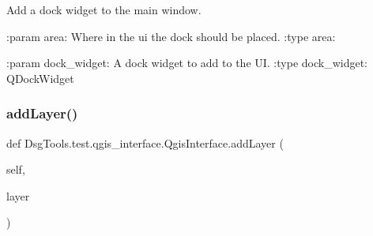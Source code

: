 \begin{DoxyVerb}Add a dock widget to the main window.

:param area: Where in the ui the dock should be placed.
:type area:

:param dock_widget: A dock widget to add to the UI.
:type dock_widget: QDockWidget
\end{DoxyVerb}
 \mbox{\label{class_dsg_tools_1_1test_1_1qgis__interface_1_1_qgis_interface_af2c8f477fd5f365124ed2008e7711aa2}} 
\subsubsection{\texorpdfstring{add\+Layer()}{addLayer()}}
{\footnotesize\ttfamily def Dsg\+Tools.\+test.\+qgis\+\_\+interface.\+Qgis\+Interface.\+add\+Layer (\begin{DoxyParamCaption}\item[{}]{self,  }\item[{}]{layer }\end{DoxyParamCaption})}

